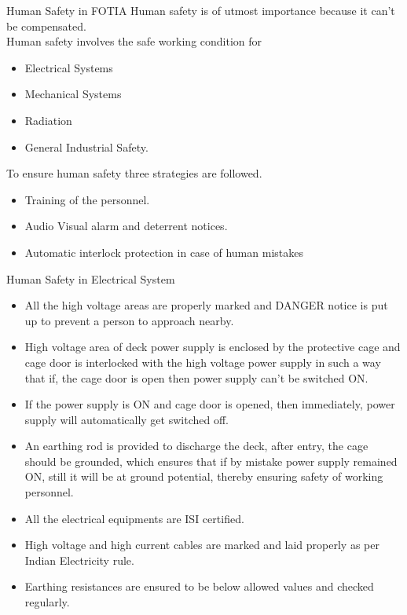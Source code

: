 \documentclass[11pt]{beamer}
\begin{document}
\begin{frame}{Human Safety in FOTIA}
Human safety is of utmost importance because it can’t be compensated.\\
	
Human safety involves the safe working condition for 
 \begin{itemize} 
 \item Electrical Systems
 \item Mechanical Systems
 \item Radiation 
 \item General Industrial Safety.
\end{itemize}		
To ensure human safety three strategies are followed. 
\begin{itemize}
\item Training of the personnel.
\item Audio Visual alarm and deterrent notices.
\item Automatic interlock protection in case of human mistakes 
\end{itemize}	 
 
\end{frame}

\begin{frame}{Human Safety in Electrical System}

 \begin{itemize} 
 \item All the high voltage areas are properly marked and DANGER notice is put up to prevent a person to approach nearby.
\item High voltage area of  deck power supply is enclosed by the protective cage and cage door is interlocked with the high voltage power supply in such a way that if, the cage door is open then power supply can’t be switched ON.
\item If the power supply is ON and cage door is opened, then immediately, power supply will automatically get switched off.
\item An earthing rod is provided to discharge the deck, after entry, the cage should be grounded, which ensures that if by mistake power supply remained ON, still it will be at ground potential, thereby ensuring safety of working personnel. \item All the electrical equipments are ISI certified.
 \item High voltage and high current cables are marked and laid properly as per Indian Electricity rule.
\item Earthing resistances are ensured to be below allowed values and checked regularly. 
\end{itemize}		
	 
 
\end{frame}
\end{document}
